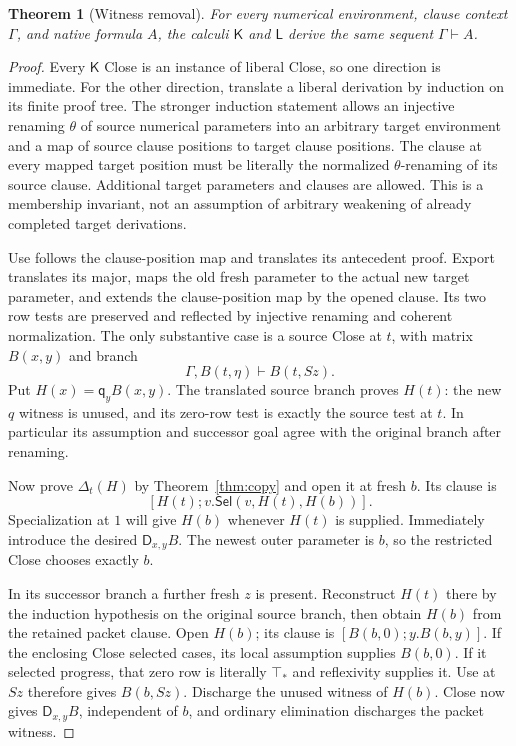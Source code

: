 \documentclass[11pt,letterpaper]{article}
\newtheorem{theorem}{Theorem}[section]
\theoremstyle{definition}\newtheorem{definition}[theorem]{Definition}
\theoremstyle{remark}\newtheorem{remark}[theorem]{Remark}
\newcommand{\K}{\mathsf K}
\newcommand{\Liberal}{\mathsf L}
\newcommand{\DD}{\mathsf D}
\newcommand{\qq}{\mathsf q}
\newcommand{\Sel}{\mathsf{Sel}}
\newcommand{\ttop}{\top_*}
\begin{document}
\begin{theorem}[Witness removal]\label{thm:restriction}
For every numerical environment, clause context $\Gamma$, and native
formula $A$, the calculi $\K$ and $\Liberal$ derive the same sequent
$\Gamma\vdash A$.
\end{theorem}
\begin{proof}
Every $\K$ Close is an instance of liberal Close, so one direction is
immediate. For the other direction, translate a liberal derivation by
induction on its finite proof tree. The stronger induction statement
allows an injective renaming $\theta$ of source numerical parameters into
an arbitrary target environment and a map of source clause positions to
target clause positions. The clause at every mapped target position must
be literally the normalized $\theta$-renaming of its source clause.
Additional target parameters and clauses are allowed. This is a
membership invariant, not an assumption of arbitrary weakening of
already completed target derivations.

Use follows the clause-position map and translates its antecedent proof.
Export translates its major, maps the old fresh parameter to the actual
new target parameter, and extends the clause-position map by the opened
clause. Its two row tests are preserved and reflected by injective
renaming and coherent normalization. The only substantive case is a source
Close at $t$, with matrix $B(x,y)$ and branch
\[
           \Gamma,B(t,\eta)\vdash B(t,Sz).
\]
Put $H(x)=\qq_y B(x,y)$. The translated source branch proves $H(t)$:
the new $q$ witness is unused, and its zero-row test is exactly the
source test at $t$. In particular its assumption and successor goal
agree with the original branch after renaming.

Now prove $\Delta_t(H)$ by Theorem~\ref{thm:copy} and open it at fresh
$b$. Its clause is
\[
            [H(t);v.\Sel(v,H(t),H(b))].
\]
Specialization at $1$ will give $H(b)$ whenever $H(t)$ is supplied.
Immediately introduce the desired $\DD_{x,y}B$. The newest outer parameter
is $b$, so the restricted Close chooses exactly $b$.

In its successor branch a further fresh $z$ is present. Reconstruct
$H(t)$ there by the induction hypothesis on the original source branch,
then obtain $H(b)$ from the retained packet clause. Open $H(b)$;
its clause is $[B(b,0);y.B(b,y)]$. If the enclosing Close selected cases,
its local assumption supplies $B(b,0)$. If it selected progress, that
zero row is literally $\ttop$ and reflexivity supplies it. Use at $Sz$
therefore gives $B(b,Sz)$. Discharge the unused witness of $H(b)$.
Close now gives $\DD_{x,y}B$, independent of $b$, and ordinary
elimination discharges the packet witness.


\end{proof}
\end{document}
